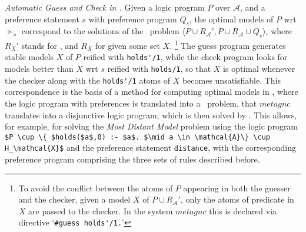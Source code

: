 
\emph{Automatic Guess and Check in \clingo.}
%
Given a logic program $P$ over $\mathcal{A}$, and a preference statement $s$ with preference program $Q_s$, 
the optimal models of $P$ wrt $\succ_s$ correspond to the solutions of the \gc\ problem
$\langle P \cup R_\mathcal{A}',P \cup R_\mathcal{A} \cup Q_s\rangle$, 
where $R_X'$ stands for , 
and $R_X$ for  given some set $X$.%
\footnote{To avoid the conflict between the atoms of $P$ appearing in both the guesser and the checker, 
given a model $X$ of $P \cup R_{\mathcal{A}}'$, only the atoms of predicate  in $X$ are passed to the checker.
In the system $\mathit{metagnc}$ this is declared via directive `\lstinline!#guess holds'/1.!'}
%
The guess program generates stable models $X$ of $P$ reified with \lstinline!holds'/1!,
while the check program looks for models better than $X$ wrt $s$ reified with \lstinline!holds/1!,
so that $X$ is optimal whenever the checker along with the \lstinline!holds'/1! atoms of $X$ becomes unsatisfiable.
%
This correspondence is the basis of a method for computing optimal models in \asprin, 
where the logic program with preferences is translated into a \gc\ problem, 
that $\mathit{metagnc}$ translates into a disjunctive logic program,
which is then solved by \clingo.
%
This allows, for example, for solving the \emph{Most Distant Model} problem using the logic program 
\lstinline[mathescape=true]!$P \cup \{ $holds($a$,0) :- $a$. $\mid a \in \mathcal{A}\} \cup H_\mathcal{X}$! 
and the preference statement \lstinline!distance!,
with the corresponding preference program comprising the three sets of rules described before.


